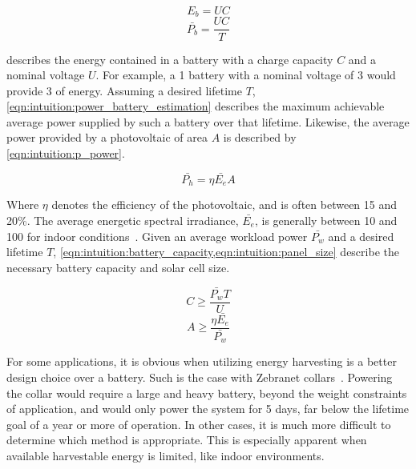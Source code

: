 \begin{equation} \label{eqn:intuition:energy_battery_estimation}
   E_b = U C
\end{equation}
\begin{equation} \label{eqn:intuition:power_battery_estimation}
   \bar{P_b} = \frac{U C}{T}
\end{equation}

\noindent
{} describes the energy contained in a battery with a charge capacity $C$ and a nominal voltage $U$. For example, a 1\ssi{\Ah} battery with a nominal voltage of 3\ssi{\volt} would provide 3\ssi{\Wh} of energy.
Assuming a desired lifetime $T$, \cref{eqn:intuition:power_battery_estimation} describes the maximum achievable average power supplied by such a battery over that lifetime.
Likewise, the average power provided by a photovoltaic of area $A$ is described by \cref{eqn:intuition:p_power}.

\begin{equation} \label{eqn:intuition:p_power}
\bar{P_h} = \eta \bar{E_e} A
\end{equation}

\noindent
Where
$\eta$ denotes the efficiency of the photovoltaic, and is often between 15 and 20\%.
The average energetic spectral irradiance, $\bar{E_e}$, is generally between 10 and 100\ssi{\micro\watt\per\centi\meter\squared} for indoor conditions~\cite{yervaGrafting12,gorlatova2013networking}.
Given an average workload power $\bar{P_w}$ and a desired lifetime $T$,
\cref{eqn:intuition:battery_capacity,eqn:intuition:panel_size}
describe the necessary battery capacity and solar cell size.

\begin{equation} \label{eqn:intuition:battery_capacity}
    C \geq \frac{\bar{P_w} T}{U}
\end{equation}
\begin{equation} \label{eqn:intuition:panel_size}
    A \geq \frac{\eta \bar{E_e}}{\bar{P_w}}
\end{equation}

For some applications, it is obvious when utilizing energy harvesting is a better design choice over a battery.
Such is the case with Zebranet collars~\cite{juang2002energy}. Powering the collar would require a large and heavy battery, beyond the weight constraints of application, and would only power the system for 5 days, far below the lifetime goal of a year or more of operation.
In other cases, it is much more difficult to determine which method is appropriate.
This is especially apparent when available harvestable energy is limited, like indoor environments.


